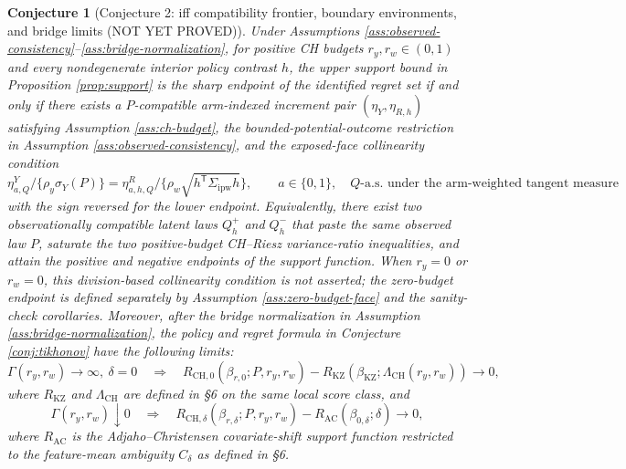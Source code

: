 \documentclass[11pt]{article}
\newcommand{\transpose}{\mathsf{T}}
\theoremstyle{definition}
\theoremstyle{plain}
\newtheorem{conjecture}{Conjecture}
\theoremstyle{remark}
\begin{document}
\begin{conjecture}[Conjecture 2: iff compatibility frontier, boundary environments, and bridge limits (NOT YET PROVED)]\label{conj:sharp-bridge}
Under Assumptions \ref{ass:observed-consistency}--\ref{ass:bridge-normalization}, for positive CH budgets $r_y,r_w\in(0,1)$ and every nondegenerate interior policy contrast $h$, the upper support bound in Proposition \ref{prop:support} is the sharp endpoint of the identified regret set if and only if there exists a $P$-compatible arm-indexed increment pair $(\eta_Y,\eta_{R,h})$ satisfying Assumption \ref{ass:ch-budget}, the bounded-potential-outcome restriction in Assumption \ref{ass:observed-consistency}, and the exposed-face collinearity condition
\[
  \eta^Y_{a,Q}/\{\rho_y\sigma_Y(P)\}
  =
  \eta^R_{a,h,Q}/\{\rho_w\sqrt{h^\transpose\Sigma_{\mathrm{ipw}}h}\},
  \qquad a\in\{0,1\},
  \quad Q\text{-a.s. under the arm-weighted tangent measure}
\]
with the sign reversed for the lower endpoint. Equivalently, there exist two observationally compatible latent laws $Q_h^+$ and $Q_h^-$ that paste the same observed law $P$, saturate the two positive-budget CH--Riesz variance-ratio inequalities, and attain the positive and negative endpoints of the support function. When $r_y=0$ or $r_w=0$, this division-based collinearity condition is not asserted; the zero-budget endpoint is defined separately by Assumption \ref{ass:zero-budget-face} and the sanity-check corollaries. Moreover, after the bridge normalization in Assumption \ref{ass:bridge-normalization}, the policy and regret formula in Conjecture \ref{conj:tikhonov} have the following limits:
\[
  \Gamma(r_y,r_w)\to\infty,\ \delta=0
  \quad\Longrightarrow\quad
  R_{\mathrm{CH},0}(\beta_{r,0};P,r_y,r_w)
  -R_{\mathrm{KZ}}(\beta_{\mathrm{KZ}};\Lambda_{\mathrm{CH}}(r_y,r_w))
  \to0,
\]
where $R_{\mathrm{KZ}}$ and $\Lambda_{\mathrm{CH}}$ are defined in \S6 on the same local score class, and
\[
  \Gamma(r_y,r_w)\downarrow0
  \quad\Longrightarrow\quad
  R_{\mathrm{CH},\delta}(\beta_{r,\delta};P,r_y,r_w)
  -R_{\mathrm{AC}}(\beta_{0,\delta};\delta)
  \to0,
\]
where $R_{\mathrm{AC}}$ is the Adjaho--Christensen covariate-shift support function restricted to the feature-mean ambiguity $C_\delta$ as defined in \S6.
\end{conjecture}
\end{document}
